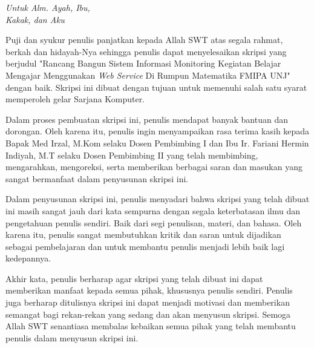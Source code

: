 \documentclass{jtetiskripsi}
\begin{document}
\cover


%


\acknowledgment
\begin{flushright}
	\emph{Untuk Alm. Ayah, Ibu,} \\
	\emph{Kakak, dan Aku}
\end{flushright}

\preface
\begin{onehalfspace}
Puji dan syukur penulis panjatkan kepada Allah SWT atas segala rahmat, berkah dan hidayah-Nya sehingga penulis dapat menyelesaikan skripsi yang berjudul "Rancang Bangun Sistem Informasi Monitoring Kegiatan Belajar Mengajar Menggunakan \textit{Web Service} Di Rumpun Matematika FMIPA UNJ" dengan baik. Skripsi ini dibuat dengan tujuan untuk memenuhi salah satu syarat memperoleh gelar Sarjana Komputer.  

Dalam proses pembuatan skripsi ini, penulis mendapat banyak bantuan dan dorongan. Oleh karena itu, penulis ingin menyampaikan rasa terima kasih kepada Bapak Med Irzal, M.Kom selaku Dosen Pembimbing I dan Ibu Ir. Fariani Hermin Indiyah, M.T selaku Dosen Pembimbing II yang telah membimbing, mengarahkan, mengoreksi, serta memberikan berbagai saran dan masukan yang sangat bermanfaat dalam penyusunan skripsi ini.

Dalam penyusunan skripsi ini, penulis menyadari bahwa skripsi yang telah dibuat ini masih sangat jauh dari kata sempurna dengan segala keterbatasan ilmu dan pengetahuan penulis sendiri. Baik dari segi penulisan, materi, dan bahasa. Oleh karena itu, penulis sangat membutuhkan kritik dan saran untuk dijadikan sebagai pembelajaran dan untuk membantu penulis menjadi lebih baik lagi kedepannya.

Akhir kata, penulis berharap agar skripsi yang telah dibuat ini dapat memberikan manfaat kepada semua pihak, khususnya penulis sendiri. Penulis juga berharap ditulisnya skripsi ini dapat menjadi motivasi dan memberikan semangat bagi rekan-rekan yang sedang dan akan menyusun skripsi. Semoga Allah SWT senantiasa membalas kebaikan semua pihak yang telah membantu penulis dalam menyusun skripsi ini.
\end{onehalfspace}
\vspace{.5cm}
\end{document}
